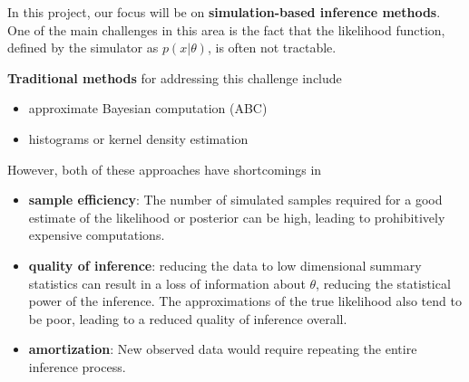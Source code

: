 
In this project, our focus will be on \textbf{simulation-based inference methods}. One of the main challenges in this area is the fact that the likelihood function, defined by the simulator as $p(x|\theta)$, is often not tractable.

\textbf{Traditional methods} for addressing this challenge include 
\begin{itemize}
  \item approximate Bayesian computation (ABC) 
  \item histograms or kernel density estimation
\end{itemize}

However, both of these approaches have shortcomings in 
\begin{itemize}
  \item \textbf{sample efficiency}: The number of simulated samples required for a good estimate of the likelihood or posterior can be high, leading to prohibitively expensive computations.
  \item \textbf{quality of inference}: reducing the data to low dimensional summary statistics can result in a loss of information about $\theta$, reducing the statistical power of the inference. The approximations of the true likelihood also tend to be poor, leading to a reduced quality of inference overall. 
  \item \textbf{amortization}: New observed data would require repeating the entire inference process.
\end{itemize}

